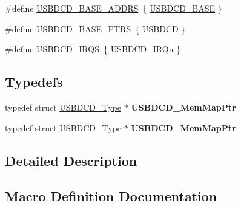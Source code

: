 \begin{DoxyCompactItemize}
\item 
\#define \hyperlink{group__USBDCD__Peripheral__Access__Layer_ga025e2ac90159213302b6b5801a3c8d22}{U\+S\+B\+D\+C\+D\+\_\+\+B\+A\+S\+E\+\_\+\+A\+D\+D\+RS}~\{ \hyperlink{group__USBDCD__Peripheral__Access__Layer_ga56567d124166bfc332eefcbeb3c8bfb7}{U\+S\+B\+D\+C\+D\+\_\+\+B\+A\+SE} \}
\item 
\#define \hyperlink{group__USBDCD__Peripheral__Access__Layer_ga343ff2427307e24846cef614df7cea8a}{U\+S\+B\+D\+C\+D\+\_\+\+B\+A\+S\+E\+\_\+\+P\+T\+RS}~\{ \hyperlink{group__USBDCD__Peripheral__Access__Layer_gacd05c07582eca3f464f8c7436ed56ec1}{U\+S\+B\+D\+CD} \}
\item 
\#define \hyperlink{group__USBDCD__Peripheral__Access__Layer_ga052db5d600e4b53eb3e2ea7ef8281b6e}{U\+S\+B\+D\+C\+D\+\_\+\+I\+R\+QS}~\{ \hyperlink{group__Interrupt__vector__numbers_gga666eb0caeb12ec0e281415592ae89083a92a4fa8925ba3e31f873313f577f18a7}{U\+S\+B\+D\+C\+D\+\_\+\+I\+R\+Qn} \}
\end{DoxyCompactItemize}
\subsection*{Typedefs}
\begin{DoxyCompactItemize}
\item 
typedef struct \hyperlink{structUSBDCD__Type}{U\+S\+B\+D\+C\+D\+\_\+\+Type} $\ast$ {\bfseries U\+S\+B\+D\+C\+D\+\_\+\+Mem\+Map\+Ptr}\hypertarget{group__USBDCD__Peripheral__Access__Layer_ga4ec3d0d02ec49ccc9fbceae223bb3567}{}\label{group__USBDCD__Peripheral__Access__Layer_ga4ec3d0d02ec49ccc9fbceae223bb3567}

\item 
typedef struct \hyperlink{structUSBDCD__Type}{U\+S\+B\+D\+C\+D\+\_\+\+Type} $\ast$ {\bfseries U\+S\+B\+D\+C\+D\+\_\+\+Mem\+Map\+Ptr}\hypertarget{group__USBDCD__Peripheral__Access__Layer_ga4ec3d0d02ec49ccc9fbceae223bb3567}{}\label{group__USBDCD__Peripheral__Access__Layer_ga4ec3d0d02ec49ccc9fbceae223bb3567}

\end{DoxyCompactItemize}


\subsection{Detailed Description}


\subsection{Macro Definition Documentation}

